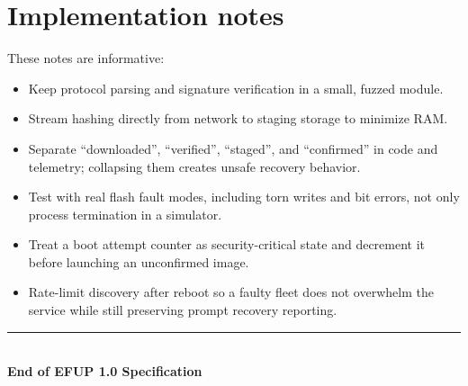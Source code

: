 \section{Implementation notes}

These notes are informative:

\begin{itemize}
  \item Keep protocol parsing and signature verification in a small, fuzzed module.
  \item Stream hashing directly from network to staging storage to minimize RAM.
  \item Separate ``downloaded'', ``verified'', ``staged'', and ``confirmed'' in code
        and telemetry; collapsing them creates unsafe recovery behavior.
  \item Test with real flash fault modes, including torn writes and bit errors, not
        only process termination in a simulator.
  \item Treat a boot attempt counter as security-critical state and decrement it
        before launching an unconfirmed image.
  \item Rate-limit discovery after reboot so a faulty fleet does not overwhelm the
        service while still preserving prompt recovery reporting.
\end{itemize}

\vfill
\begin{center}
  \color{navy}\rule{0.72\textwidth}{0.5pt}\\[4pt]
  \textbf{End of EFUP 1.0 Specification}
\end{center}
